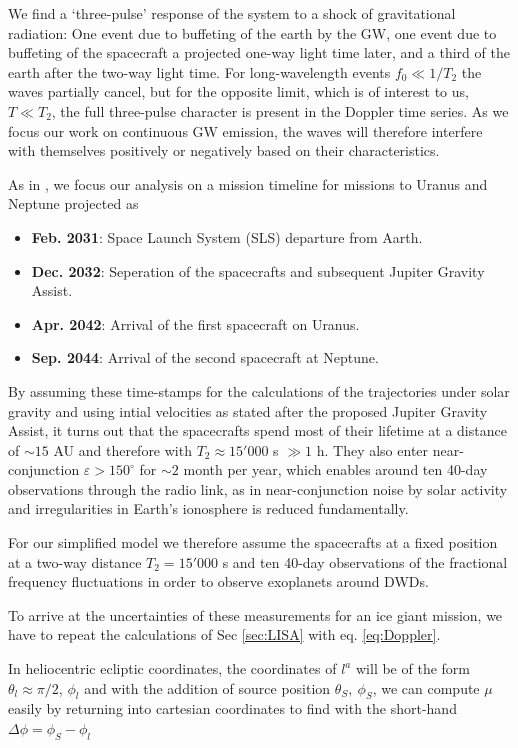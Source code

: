 \documentclass{aa}
\begin{document}
We find a `three-pulse' response of the system to a shock of gravitational radiation: One event due to buffeting of the earth by the GW, one event due to buffeting of the spacecraft a projected one-way light time later, and a third of the earth after the two-way light time. For long-wavelength events $f_0 \ll 1/T_2$ the waves partially cancel, but for the opposite limit, which is of interest to us, $T \ll T_2$, the full three-pulse character is present in the Doppler time series. As we focus our work on continuous GW emission, the waves will therefore interfere with themselves positively or negatively based on their characteristics.

As in \citep{soyuer2021}, we focus our analysis on a mission timeline for missions to Uranus and Neptune projected as
\begin{itemize}
    \item \textbf{Feb. 2031}: Space Launch System (SLS) departure from Aarth.
    \item \textbf{Dec. 2032}: Seperation of the spacecrafts and subsequent Jupiter Gravity Assist.
    \item \textbf{Apr. 2042}: Arrival of the first spacecraft on Uranus.
    \item \textbf{Sep. 2044}: Arrival of the second spacecraft at Neptune.
\end{itemize}

By assuming these time-stamps for the calculations of the trajectories under solar gravity and using intial velocities as stated after the proposed Jupiter Gravity Assist, it turns out that the spacecrafts spend most of their lifetime at a distance of $\sim 15$ AU and therefore with $T_2\approx 15'000$ s $\gg1$ h. They also enter near-conjunction $\varepsilon>150^\circ$ for $\sim 2$ month per year, which enables around ten 40-day observations through the radio link, as in near-conjunction noise by solar activity and irregularities in Earth's ionosphere is reduced fundamentally.

For our simplified model we therefore assume the spacecrafts at a fixed position at a two-way distance $T_2 = 15'000$ s and ten 40-day observations of the fractional frequency fluctuations in order to observe exoplanets around DWDs.

To arrive at the uncertainties of these measurements for an ice giant mission, we have to repeat the calculations of Sec \ref{sec:LISA} with eq. \ref{eq:Doppler}.

In heliocentric ecliptic coordinates, the coordinates of $l^a$ will be of the form $\theta_l\approx \pi/2$, $\phi_l$ and with the addition of source position $\theta_S,\ \phi_S$, we can compute $\mu$ easily by returning into cartesian coordinates to find with the short-hand $\Delta \phi = \phi_S-\phi_l$
\end{document}
